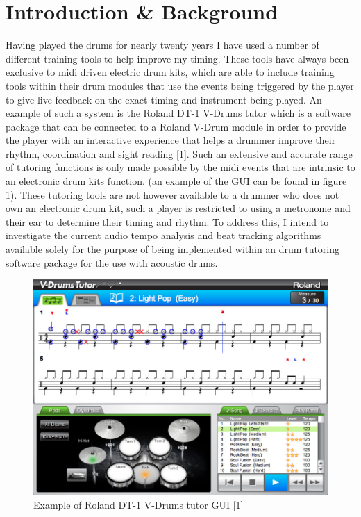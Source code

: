 \documentclass[a4paper, 11pt]{article}
\begin{document}
 

\maketitle
\newpage
\tableofcontents
\clearpage

\maketitle{} \section{Introduction \& Background}
Having played the drums for nearly twenty years I have used a number of different training tools to help improve my timing. These tools have always been exclusive to midi driven electric drum kits, which are able to include training tools within their drum modules that use the events being triggered by the player to give live feedback on the exact timing and instrument being played. An example of such a system is the Roland DT-1 V-Drums tutor which is a software package that can be connected to a Roland V-Drum module in order to provide the player with an interactive experience that helps a drummer improve their rhythm, coordination and sight reading [1]. Such an extensive and accurate range of tutoring functions is only made possible by the midi events that are intrinsic to an electronic drum kits function. (an example of the GUI can be found in figure 1). These tutoring tools are not however available to a drummer who does not own an electronic drum kit, such a player is restricted to using a metronome and their ear to determine their timing and rhythm. To address this, I intend to investigate the current audio tempo analysis and beat tracking algorithms available solely for the purpose of being implemented within an drum tutoring software package for the use with acoustic drums.
\begin{figure}[h]
\caption{Example of Roland DT-1 V-Drums tutor GUI [1]}
	\centering
	\includegraphics[scale=0.25]{dt-1_ss_main_notation_gal}
\end{figure}
\end{document}
